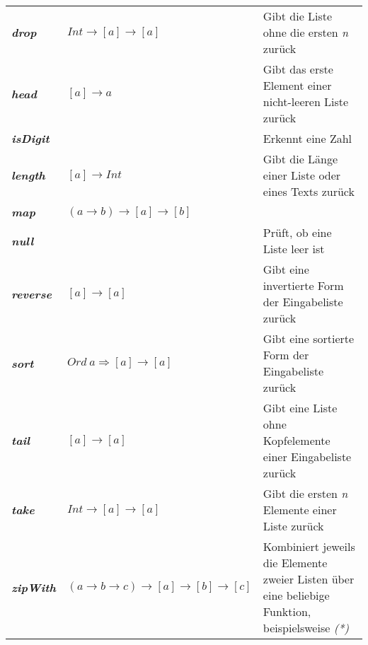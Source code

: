 \begin{table}[h]
\begin{tabularx}{\textwidth}{l|X|X}
	\textbf{\textit{drop}} & \(Int \rightarrow [a] \rightarrow [a]\) & Gibt die Liste ohne die ersten \textit{n} zurück \\
	\textbf{\textit{head}} & \([a] \rightarrow a\) & Gibt das erste Element einer nicht-leeren Liste zurück \\
	\textbf{\textit{isDigit}} & & Erkennt eine Zahl \\
	\textbf{\textit{length}} & \([a] \rightarrow Int\) & Gibt die Länge einer Liste oder eines Texts zurück \\
	\textbf{\textit{map}} & \((a \rightarrow b) \rightarrow [a] \rightarrow [b]\) & \\
	\textbf{\textit{null}} & & Prüft, ob eine Liste leer ist \\
	\textbf{\textit{reverse}} & \([a] \rightarrow [a]\) & Gibt eine invertierte Form der Eingabeliste zurück \\
	\textbf{\textit{sort}} & \(Ord~a \Rightarrow [a] \rightarrow [a]\) & Gibt eine sortierte Form der Eingabeliste zurück \\
	\textbf{\textit{tail}} & \([a] \rightarrow [a]\) & Gibt eine Liste ohne Kopfelemente einer Eingabeliste zurück \\
	\textbf{\textit{take}} & \(Int \rightarrow [a] \rightarrow [a]\) & Gibt die ersten \textit{n} Elemente einer Liste zurück \\
	\textbf{\textit{zipWith}} & \((a \rightarrow b \rightarrow c) \rightarrow [a] \rightarrow [b] \rightarrow [c]\) & Kombiniert jeweils die Elemente zweier Listen über eine beliebige Funktion, beispielsweise \textit{(*)} \\
\end{tabularx}
\end{table}